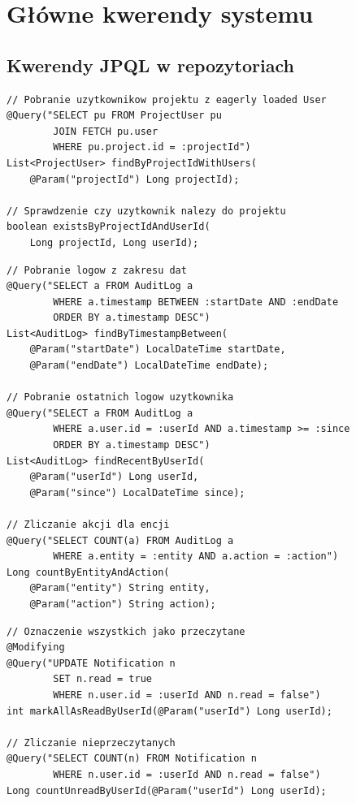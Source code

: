 \documentclass[12pt,a4paper]{report}
\begin{document}
\section{Główne kwerendy systemu}

\subsection{Kwerendy JPQL w repozytoriach}

\begin{lstlisting}[style=javastyle, caption={ProjectUserRepository - zapytania}]
// Pobranie uzytkownikow projektu z eagerly loaded User
@Query("SELECT pu FROM ProjectUser pu 
        JOIN FETCH pu.user 
        WHERE pu.project.id = :projectId")
List<ProjectUser> findByProjectIdWithUsers(
    @Param("projectId") Long projectId);

// Sprawdzenie czy uzytkownik nalezy do projektu
boolean existsByProjectIdAndUserId(
    Long projectId, Long userId);
\end{lstlisting}

\begin{lstlisting}[style=javastyle, caption={AuditLogRepository - zapytania}]
// Pobranie logow z zakresu dat
@Query("SELECT a FROM AuditLog a 
        WHERE a.timestamp BETWEEN :startDate AND :endDate 
        ORDER BY a.timestamp DESC")
List<AuditLog> findByTimestampBetween(
    @Param("startDate") LocalDateTime startDate, 
    @Param("endDate") LocalDateTime endDate);

// Pobranie ostatnich logow uzytkownika
@Query("SELECT a FROM AuditLog a 
        WHERE a.user.id = :userId AND a.timestamp >= :since 
        ORDER BY a.timestamp DESC")
List<AuditLog> findRecentByUserId(
    @Param("userId") Long userId, 
    @Param("since") LocalDateTime since);

// Zliczanie akcji dla encji
@Query("SELECT COUNT(a) FROM AuditLog a 
        WHERE a.entity = :entity AND a.action = :action")
Long countByEntityAndAction(
    @Param("entity") String entity, 
    @Param("action") String action);
\end{lstlisting}

\begin{lstlisting}[style=javastyle, caption={NotificationRepository - zapytania}]
// Oznaczenie wszystkich jako przeczytane
@Modifying
@Query("UPDATE Notification n 
        SET n.read = true 
        WHERE n.user.id = :userId AND n.read = false")
int markAllAsReadByUserId(@Param("userId") Long userId);

// Zliczanie nieprzeczytanych
@Query("SELECT COUNT(n) FROM Notification n 
        WHERE n.user.id = :userId AND n.read = false")
Long countUnreadByUserId(@Param("userId") Long userId);
\end{lstlisting}
\end{document}
